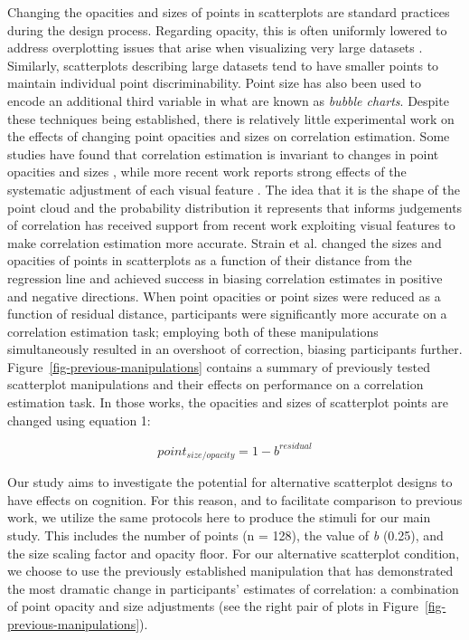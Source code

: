 \documentclass[sigconf]{acmart}
\begin{document}
Changing the opacities and sizes of points in scatterplots are standard
practices during the design process. Regarding opacity, this is often
uniformly lowered to address overplotting issues that arise when
visualizing very large datasets \citep{matejka_2015}. Similarly,
scatterplots describing large datasets tend to have smaller points to
maintain individual point discriminability. Point size has also been
used to encode an additional third variable in what are known as
\emph{bubble charts}. Despite these techniques being established, there
is relatively little experimental work on the effects of changing point
opacities and sizes on correlation estimation. Some studies have found
that correlation estimation is invariant to changes in point opacities
and sizes \citep{rensink_2014, rensink_2017}, while more recent work
reports strong effects of the systematic adjustment of each visual
feature \citep{strain_2023, strain_2023b, strain_2024}. The idea that it
is the shape of the point cloud and the probability distribution it
represents that informs judgements of correlation has received support
from recent work exploiting visual features to make correlation
estimation more accurate. Strain et al.
\citep{strain_2023, strain_2023b, strain_2024} changed the sizes and
opacities of points in scatterplots as a function of their distance from
the regression line and achieved success in biasing correlation
estimates in positive and negative directions. When point opacities
\citep{strain_2023} or point sizes \citep{strain_2023b} were reduced as
a function of residual distance, participants were significantly more
accurate on a correlation estimation task; employing both of these
manipulations simultaneously \citep{strain_2024} resulted in an
overshoot of correction, biasing participants further.
Figure~\ref{fig-previous-manipulations} contains a summary of previously
tested scatterplot manipulations and their effects on performance on a
correlation estimation task. In those works, the opacities and sizes of
scatterplot points are changed using equation 1:

\begin{equation}
  point_{size/opacity} = 1 - b^{residual}
\end{equation}

Our study aims to investigate the potential for alternative scatterplot
designs to have effects on cognition. For this reason, and to facilitate
comparison to previous work, we utilize the same protocols here to
produce the stimuli for our main study. This includes the number of
points (n = 128), the value of \emph{b} (0.25), and the size scaling
factor and opacity floor. For our alternative scatterplot condition, we
choose to use the previously established manipulation that has
demonstrated the most dramatic change in participants' estimates of
correlation: a combination of point opacity and size adjustments
\citep{strain_2024} (see the right pair of plots in
Figure~\ref{fig-previous-manipulations}).
\end{document}
